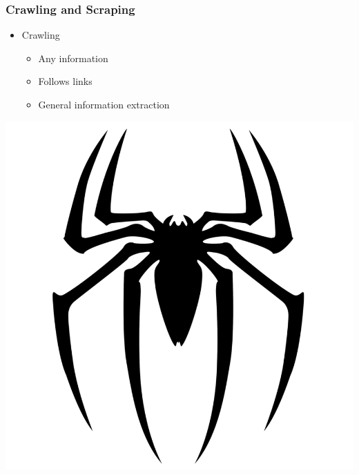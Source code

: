 \begin{frame}
    \frametitle{Crawling and Scraping}

\begin{minipage}[c]{0.7\textwidth}
\begin{itemize}
    \item Crawling
    \begin{itemize}
        \item Any information
        \item Follows links
        \item General information extraction
    \end{itemize}
\end{itemize}
\end{minipage}
\hfill
\begin{minipage}[c]{0.2\textwidth}
\hspace*{-20pt}
\includegraphics[scale=0.06]{img/icons/spider.png}
\end{minipage}
\medskip \medskip \medskip


\end{frame}
